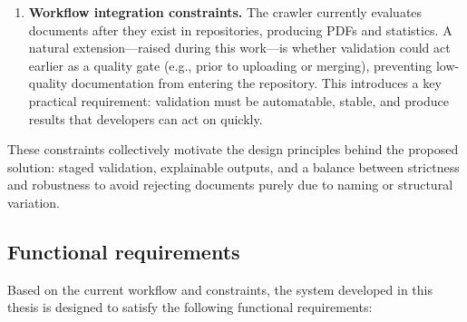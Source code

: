 \begin{enumerate}
    \item \textbf{Workflow integration constraints.}
    The crawler currently evaluates documents after they exist in repositories, producing PDFs and statistics. A natural extension—raised during this work—is whether validation could act earlier as a quality gate (e.g., prior to uploading or merging), preventing low-quality documentation from entering the repository. This introduces a key practical requirement: validation must be automatable, stable, and produce results that developers can act on quickly.
\end{enumerate}

These constraints collectively motivate the design principles behind the proposed solution: staged validation, explainable outputs, and a balance between strictness and robustness to avoid rejecting documents purely due to naming or structural variation.

\subsection{Functional requirements}
Based on the current workflow and constraints, the system developed in this thesis is designed to satisfy the following functional requirements:

